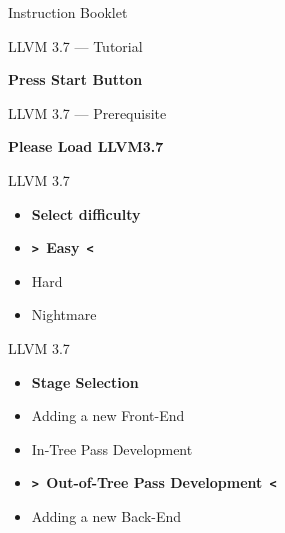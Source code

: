 \documentclass[14pt]{beamer}
\begin{document}
\begin{frame}{Instruction Booklet}
    \end{frame}


    \begin{frame}{LLVM 3.7 --- Tutorial}
        \begin{center}
            \textbf{\Large Press Start Button}
        \end{center}
    \end{frame}

    \begin{frame}{LLVM 3.7 --- Prerequisite}
        \begin{center}
            \textbf{\Large Please Load LLVM3.7}
        \end{center}
    \end{frame}

    \begin{frame}{LLVM 3.7}
        \begin{center}
            \begin{itemize}
                \centering
                \item[]\alert{\bf Select difficulty}\vspace{1em}
                \item[] \textbf{\texttt{>~}Easy\texttt{~<}}
                \item[] Hard
                \item[] Nightmare
            \end{itemize}
        \end{center}
    \end{frame}

    \begin{frame}{LLVM 3.7}

            \begin{itemize}
                \centering
                \item[]\alert{\bf Stage Selection}\vspace{1em}
                \item[] Adding a new Front-End
                \item[] In-Tree Pass Development
                \item[] \textbf{\texttt{>~}Out-of-Tree Pass Development\texttt{~<}}
                \item[] Adding a new Back-End
            \end{itemize}

    \end{frame}
\end{document}
